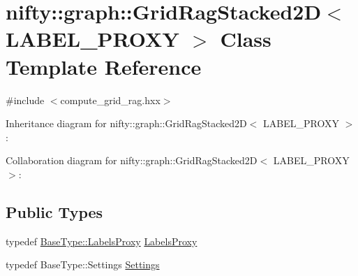 \hypertarget{classnifty_1_1graph_1_1GridRagStacked2D}{}\section{nifty\+:\+:graph\+:\+:Grid\+Rag\+Stacked2\+D$<$ L\+A\+B\+E\+L\+\_\+\+P\+R\+O\+X\+Y $>$ Class Template Reference}
\label{classnifty_1_1graph_1_1GridRagStacked2D}


{\ttfamily \#include $<$compute\+\_\+grid\+\_\+rag.\+hxx$>$}



Inheritance diagram for nifty\+:\+:graph\+:\+:Grid\+Rag\+Stacked2\+D$<$ L\+A\+B\+E\+L\+\_\+\+P\+R\+O\+X\+Y $>$\+:


Collaboration diagram for nifty\+:\+:graph\+:\+:Grid\+Rag\+Stacked2\+D$<$ L\+A\+B\+E\+L\+\_\+\+P\+R\+O\+X\+Y $>$\+:
\subsection*{Public Types}
\begin{DoxyCompactItemize}
\item 
typedef \hyperlink{classnifty_1_1graph_1_1GridRag_ad3146f72301da4f45b51e3b692776cf1}{Base\+Type\+::\+Labels\+Proxy} \hyperlink{classnifty_1_1graph_1_1GridRagStacked2D_a09b44c819b97274a1025dc68cb6b3dc9}{Labels\+Proxy}
\item 
typedef Base\+Type\+::\+Settings \hyperlink{classnifty_1_1graph_1_1GridRagStacked2D_a7b0a5b8d3cb7ac39213e5306fd42aa27}{Settings}
\end{DoxyCompactItemize}
